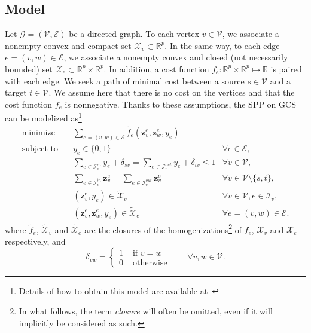 \documentclass[a4paper, 12pt]{article}
\newlength{\indentsize}
\begin{document}
\subsection{Model}\label{subsec:model}
\hspace{\indentsize} Let $\mathcal{G} = (\mathcal{V}, \mathcal{E})$ be a directed graph. To each vertex $v \in \mathcal{V}$, we associate a nonempty convex and compact set $\mathcal{X}_v \subset \mathbb{R}^p$. In the same way, to each edge $e = (v,w) \in \mathcal{E}$, we associate a nonempty convex and closed (not necessarily bounded) set $\mathcal{X}_e \subset \mathbb{R}^p \times \mathbb{R}^p$. In addition, a cost function $f_e : \mathbb{R}^p \times \mathbb{R}^p \mapsto \mathbb{R}$ is paired with each edge. We seek a path of minimal cost between a source $s \in \mathcal{V}$ and a target $t \in \mathcal{V}$. We assume here that there is no cost on the vertices and that the cost function $f_e$ is nonnegative. Thanks to these assumptions, the SPP on GCS can be modelized as\footnote{Details of how to obtain this model are available at~\cite[Chapters 5, 6 and 9]{Tobia}}~\cite[eq. 9.5]{Tobia}
\begin{subequations}\label{eq:vertices}
    \begin{align}
    \text{minimize}\quad   & \sum_{e = (v,w) \in \mathcal{E}} \tilde{f}_e (\mathbf{z}_v^e, \mathbf{z}_w^e, y_e)\label{eq:vertices-a}\\
    \text{subject to}\quad & y_e \in \{0, 1\} & \forall e \in \mathcal{E},\label{eq:vertices-b}\\
                           & \sum_{e \in \mathcal{I}_v^{in}} y_e + \delta_{sv} = \sum_{e \in \mathcal{I}_v^{out}} y_e + \delta_{tv} \leq 1 & \forall v \in \mathcal{V},\label{eq:vertices-c}\\
                           & \sum_{e \in \mathcal{I}_v^{in}} \mathbf{z}_v^e = \sum_{e \in \mathcal{I}_v^{out}} \mathbf{z}_v^e & \forall v \in \mathcal{V} \setminus \{s, t\},\label{eq:vertices-d}\\
                           & (\mathbf{z}_v^e, y_e) \in \tilde{\mathcal{X}}_v & \forall v \in \mathcal{V}, e \in \mathcal{I}_v,\label{eq:vertices-e}\\
                           & (\mathbf{z}_v^e, \mathbf{z}_w^e, y_e) \in \tilde{\mathcal{X}}_e & \forall e = (v,w) \in \mathcal{E}.\label{eq:vertices-f}
    \end{align}
\end{subequations}
where $\tilde{f}_e$, $\tilde{\mathcal{X}}_v$ and $\tilde{\mathcal{X}}_e$ are the closures of the homogenizations\footnote{In what follows, the term \textit{closure} will often be omitted, even if it will implicitly be considered as such.} of $f_e$, $\mathcal{X}_v$ and $\mathcal{X}_e$ respectively, and \[\delta_{vw} = \begin{cases} 1 & \text{ if } v = w\\ 0 & \text{ otherwise}\end{cases} \qquad \forall v,w \in \mathcal{V}.\]
\end{document}
